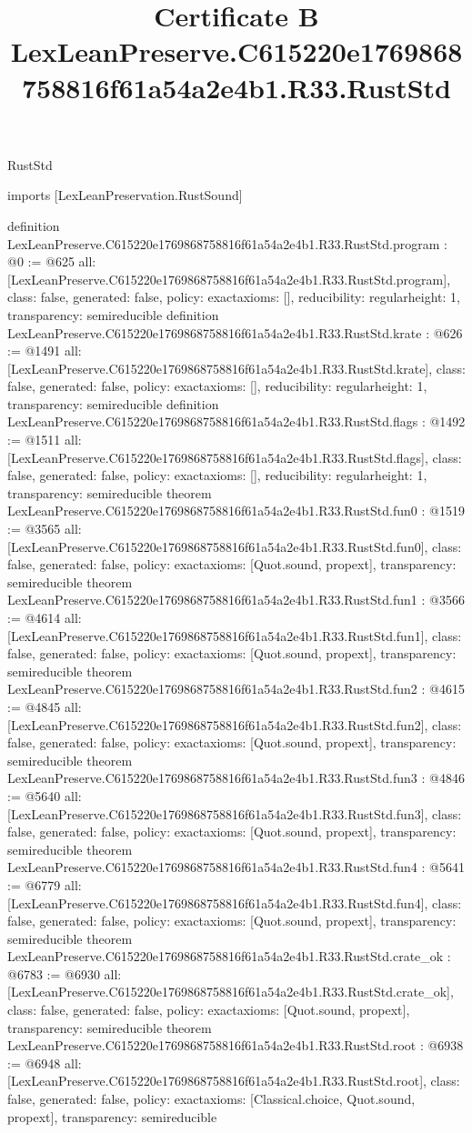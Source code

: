 \begin{lexlean}{RustStd}
\title{Certificate B LexLeanPreserve.C615220e1769868758816f61a54a2e4b1.R33.RustStd}
\begin{coremodule}
imports [LexLeanPreservation.RustSound]

definition LexLeanPreserve.C615220e1769868758816f61a54a2e4b1.R33.RustStd.program : @0 := @625 {
  all: [LexLeanPreserve.C615220e1769868758816f61a54a2e4b1.R33.RustStd.program],
  class: false,
  generated: false,
  policy: exact{axioms: []},
  reducibility: regular{height: 1},
  transparency: semireducible
}
definition LexLeanPreserve.C615220e1769868758816f61a54a2e4b1.R33.RustStd.krate : @626 := @1491 {
  all: [LexLeanPreserve.C615220e1769868758816f61a54a2e4b1.R33.RustStd.krate],
  class: false,
  generated: false,
  policy: exact{axioms: []},
  reducibility: regular{height: 1},
  transparency: semireducible
}
definition LexLeanPreserve.C615220e1769868758816f61a54a2e4b1.R33.RustStd.flags : @1492 := @1511 {
  all: [LexLeanPreserve.C615220e1769868758816f61a54a2e4b1.R33.RustStd.flags],
  class: false,
  generated: false,
  policy: exact{axioms: []},
  reducibility: regular{height: 1},
  transparency: semireducible
}
theorem LexLeanPreserve.C615220e1769868758816f61a54a2e4b1.R33.RustStd.fun0 : @1519 := @3565 {
  all: [LexLeanPreserve.C615220e1769868758816f61a54a2e4b1.R33.RustStd.fun0],
  class: false,
  generated: false,
  policy: exact{axioms: [Quot.sound, propext]},
  transparency: semireducible
}
theorem LexLeanPreserve.C615220e1769868758816f61a54a2e4b1.R33.RustStd.fun1 : @3566 := @4614 {
  all: [LexLeanPreserve.C615220e1769868758816f61a54a2e4b1.R33.RustStd.fun1],
  class: false,
  generated: false,
  policy: exact{axioms: [Quot.sound, propext]},
  transparency: semireducible
}
theorem LexLeanPreserve.C615220e1769868758816f61a54a2e4b1.R33.RustStd.fun2 : @4615 := @4845 {
  all: [LexLeanPreserve.C615220e1769868758816f61a54a2e4b1.R33.RustStd.fun2],
  class: false,
  generated: false,
  policy: exact{axioms: [Quot.sound, propext]},
  transparency: semireducible
}
theorem LexLeanPreserve.C615220e1769868758816f61a54a2e4b1.R33.RustStd.fun3 : @4846 := @5640 {
  all: [LexLeanPreserve.C615220e1769868758816f61a54a2e4b1.R33.RustStd.fun3],
  class: false,
  generated: false,
  policy: exact{axioms: [Quot.sound, propext]},
  transparency: semireducible
}
theorem LexLeanPreserve.C615220e1769868758816f61a54a2e4b1.R33.RustStd.fun4 : @5641 := @6779 {
  all: [LexLeanPreserve.C615220e1769868758816f61a54a2e4b1.R33.RustStd.fun4],
  class: false,
  generated: false,
  policy: exact{axioms: [Quot.sound, propext]},
  transparency: semireducible
}
theorem LexLeanPreserve.C615220e1769868758816f61a54a2e4b1.R33.RustStd.crate_ok : @6783 := @6930 {
  all: [LexLeanPreserve.C615220e1769868758816f61a54a2e4b1.R33.RustStd.crate_ok],
  class: false,
  generated: false,
  policy: exact{axioms: [Quot.sound, propext]},
  transparency: semireducible
}
theorem LexLeanPreserve.C615220e1769868758816f61a54a2e4b1.R33.RustStd.root : @6938 := @6948 {
  all: [LexLeanPreserve.C615220e1769868758816f61a54a2e4b1.R33.RustStd.root],
  class: false,
  generated: false,
  policy: exact{axioms: [Classical.choice, Quot.sound, propext]},
  transparency: semireducible
}


\end{coremodule}
\end{lexlean}
